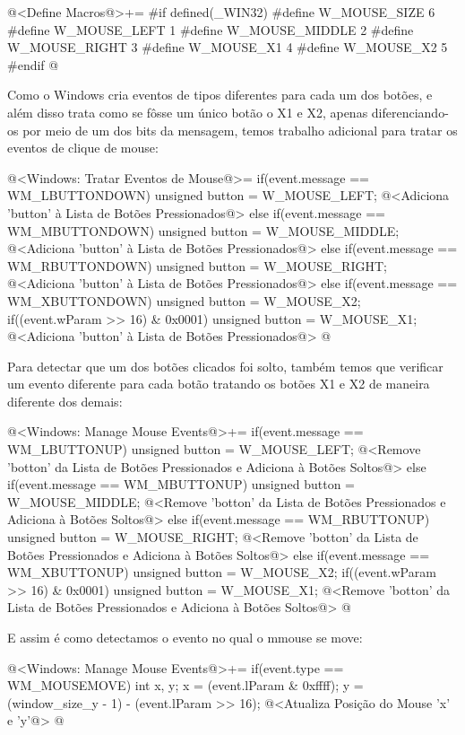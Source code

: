 \iniciocodigo
@<Define Macros@>+=
#if defined(_WIN32)
#define W_MOUSE_SIZE 6
#define W_MOUSE_LEFT   1
#define W_MOUSE_MIDDLE 2
#define W_MOUSE_RIGHT  3
#define W_MOUSE_X1     4
#define W_MOUSE_X2     5
#endif
@
\fimcodigo

Como o Windows cria eventos de tipos diferentes para cada um dos
botões, e além disso trata como se fôsse um único botão o X1 e X2,
apenas diferenciando-os por meio de um dos bits da mensagem, temos
trabalho adicional para tratar os eventos de clique de mouse:

\iniciocodigo
@<Windows: Tratar Eventos de Mouse@>=
if(event.message == WM_LBUTTONDOWN){
  unsigned button = W_MOUSE_LEFT;
  @<Adiciona 'button' à Lista de Botões Pressionados@>
}
else if(event.message == WM_MBUTTONDOWN){
  unsigned button = W_MOUSE_MIDDLE;
  @<Adiciona 'button' à Lista de Botões Pressionados@>
}
else if(event.message == WM_RBUTTONDOWN){
  unsigned button = W_MOUSE_RIGHT;
  @<Adiciona 'button' à Lista de Botões Pressionados@>
}
else if(event.message == WM_XBUTTONDOWN){
  unsigned button = W_MOUSE_X2;
  if((event.wParam >> 16) & 0x0001){
    unsigned button = W_MOUSE_X1;
  }
  @<Adiciona 'button' à Lista de Botões Pressionados@>
}
@
\fimcodigo

Para detectar que um dos botões clicados foi solto, também temos que
verificar um evento diferente para cada botão tratando os botões X1 e
X2 de maneira diferente dos demais:

\iniciocodigo
@<Windows: Manage Mouse Events@>+=
if(event.message == WM_LBUTTONUP){
  unsigned button = W_MOUSE_LEFT;
  @<Remove 'botton' da Lista de Botões Pressionados e Adiciona à Botões Soltos@>
}
else if(event.message == WM_MBUTTONUP){
  unsigned button = W_MOUSE_MIDDLE;
  @<Remove 'botton' da Lista de Botões Pressionados e Adiciona à Botões Soltos@>
}
else if(event.message == WM_RBUTTONUP){
  unsigned button = W_MOUSE_RIGHT;
  @<Remove 'botton' da Lista de Botões Pressionados e Adiciona à Botões Soltos@>
}
else if(event.message == WM_XBUTTONUP){
  unsigned button = W_MOUSE_X2;
  if((event.wParam >> 16) & 0x0001){
    unsigned button = W_MOUSE_X1;
  }
  @<Remove 'botton' da Lista de Botões Pressionados e Adiciona à Botões Soltos@>
}
@
\fimcodigo

E assim é como detectamos o evento no qual o mmouse se move:

\iniciocodigo
@<Windows: Manage Mouse Events@>+=
if(event.type == WM_MOUSEMOVE){
  int x, y;
  x = (event.lParam & 0xffff);
  y = (window_size_y - 1) - (event.lParam >> 16);
  @<Atualiza Posição do Mouse 'x' e 'y'@>
}
@
\fimcodigo

